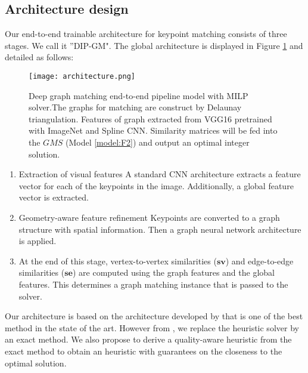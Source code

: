 \documentclass[times,onecolumn,final,authoryear]{article}
\theoremstyle{definition}
\begin{document}
\subsection{Architecture design}
Our end-to-end trainable architecture for keypoint matching consists of three stages. We call it ''DIP-GM". The global architecture is displayed in Figure \ref{fig:deepgmarchitecture} and detailed as follows:

\begin{figure}[htbp]
    \centering
    \texttt{[image: architecture.png]}
    \caption{Deep graph matching end-to-end pipeline model with MILP solver.The graphs for matching are construct by Delaunay triangulation\cite{lee1980two}. Features of graph extracted from  VGG16 pretrained with ImageNet \cite{deng2009imagenet} and Spline CNN\cite{fey2018splinecnn}. Similarity matrices will be fed into the $GMS$ (Model \ref{model:F2}) and output an optimal integer solution.}
    \label{fig:deepgmarchitecture}
\end{figure}

\begin{enumerate}
    \item Extraction of visual features A standard CNN architecture extracts a feature vector for each of the keypoints in the image. Additionally, a global feature vector is extracted.
    \item Geometry-aware feature refinement Keypoints are converted to a graph structure with spatial information. Then a graph neural network architecture is
applied. 
   \item At the end of this stage, vertex-to-vertex similarities ($\mathbf{sv}$) and edge-to-edge similarities ($\mathbf{se}$) are computed using the graph features and the global features. This determines a graph matching instance that is passed to the solver.
\end{enumerate}
Our architecture is based on the architecture developed by \cite{BB-GM} that is one of the best method in the state of the art. However from \cite{BB-GM}, we replace the heuristic solver \cite{DBLP:journals/corr/SwobodaRAKS16} by an exact method. We also propose to derive a quality-aware heuristic from the exact method to obtain an heuristic with guarantees on the closeness to the optimal solution. 
\end{document}

